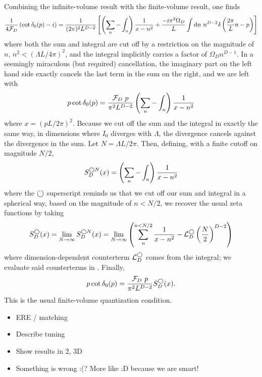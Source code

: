 Combining the infinite-volume result with the finite-volume result, one finds
\begin{equation}
    \frac{1}{4\mathcal{F}_D}\left(\cot \delta_0(p) - i\right) = \frac{1}{(2\pi)^2 L^{D-2}}\left[ \left(\sum_n- \int_n\right) \frac{1}{x-n^2} + \frac{-i \pi^2\Omega_D}{L} \int \mathrm{d}n\ n^{D-2} \delta\left(\frac{2\pi}{L}n - p\right) \right]
\end{equation}
where both the sum and integral are cut off by a restriction on the magnitude of $n$, $n^2 < (\Lambda L / 4\pi)^2$, and the integral implicitly carries a factor of $\Omega_D n^{D-1}$.
In a seemingly miraculous (but required) cancellation, the imaginary part on the left hand side exactly cancels the last term in the sum on the right, and we are left with
\begin{equation}
    p \cot \delta_0(p) = \frac{\mathcal{F}_D\ p}{\pi^2 L^{D-2}} \left(\sum_n-\int_n\right) \frac{1}{x-n^2}
\end{equation}
where $x=(pL/2\pi)^2$.
Because we cut off the sum and the integral in exactly the same way, in dimensions where $I_0$ diverges with $\Lambda$, the divergence cancels against the divergence in the sum.
Let $N=\Lambda L/2\pi$.
Then, defining, with a finite cutoff on magnitude $N/2$,
\begin{equation}\label{eq:spherical cutoff S}
    S^{\bigcirc N}_D(x) = \left(\sum_n- \int_n\right) \frac{1}{x-n^2}
\end{equation}
where the $\bigcirc$ superscript reminds us that we cut off our sum and integral in a spherical way, based on the magnitude of $n<N/2$, we recover the usual \Luscher zeta functions by taking
\begin{equation}
    S^\bigcirc_D(x)
    =
    \lim_{N\rightarrow\infty} S^{\bigcirc N}_D(x)
    =
    \lim_{N\rightarrow\infty}\left( \sum_n^{n < N/2} \frac{1}{x-n^2} - \mathcal{L}_D^\bigcirc \left(\frac{N}{2}\right)^{D-2}\right)
\end{equation}
where dimension-dependent counterterm $\mathcal{L}_D^\bigcirc$ comes from the integral; we evaluate said counterterms in .
Finally,
\begin{equation}\label{eq:spherical quantization}
    p \cot \delta_0(p) = \frac{\mathcal{F}_D\ p}{\pi^2 L^{D-2}} S^\bigcirc_D(x).
\end{equation}
This is the usual \Luscher finite-volume quantization condition.

\begin{itemize}
    \item ERE / matching
    \item Describe tuning
    \item Show results in 2, 3D
    \item Something is wrong :(?  More like :D because we are smart!
\end{itemize}
